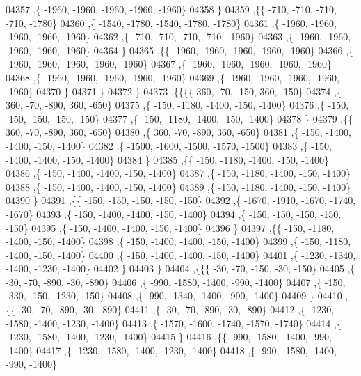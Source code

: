 \begin{DoxyCode}
04357     ,\{ -1960, -1960, -1960, -1960, -1960\}
04358     \}
04359    ,\{\{  -710,  -710,  -710,  -710, -1780\}
04360     ,\{ -1540, -1780, -1540, -1780, -1780\}
04361     ,\{ -1960, -1960, -1960, -1960, -1960\}
04362     ,\{  -710,  -710,  -710,  -710, -1960\}
04363     ,\{ -1960, -1960, -1960, -1960, -1960\}
04364     \}
04365    ,\{\{ -1960, -1960, -1960, -1960, -1960\}
04366     ,\{ -1960, -1960, -1960, -1960, -1960\}
04367     ,\{ -1960, -1960, -1960, -1960, -1960\}
04368     ,\{ -1960, -1960, -1960, -1960, -1960\}
04369     ,\{ -1960, -1960, -1960, -1960, -1960\}
04370     \}
04371    \}
04372   \}
04373  ,\{\{\{\{   360,   -70,  -150,   360,  -150\}
04374     ,\{   360,   -70,  -890,   360,  -650\}
04375     ,\{  -150, -1180, -1400,  -150, -1400\}
04376     ,\{  -150,  -150,  -150,  -150,  -150\}
04377     ,\{  -150, -1180, -1400,  -150, -1400\}
04378     \}
04379    ,\{\{   360,   -70,  -890,   360,  -650\}
04380     ,\{   360,   -70,  -890,   360,  -650\}
04381     ,\{  -150, -1400, -1400,  -150, -1400\}
04382     ,\{ -1500, -1600, -1500, -1570, -1500\}
04383     ,\{  -150, -1400, -1400,  -150, -1400\}
04384     \}
04385    ,\{\{  -150, -1180, -1400,  -150, -1400\}
04386     ,\{  -150, -1400, -1400,  -150, -1400\}
04387     ,\{  -150, -1180, -1400,  -150, -1400\}
04388     ,\{  -150, -1400, -1400,  -150, -1400\}
04389     ,\{  -150, -1180, -1400,  -150, -1400\}
04390     \}
04391    ,\{\{  -150,  -150,  -150,  -150,  -150\}
04392     ,\{ -1670, -1910, -1670, -1740, -1670\}
04393     ,\{  -150, -1400, -1400,  -150, -1400\}
04394     ,\{  -150,  -150,  -150,  -150,  -150\}
04395     ,\{  -150, -1400, -1400,  -150, -1400\}
04396     \}
04397    ,\{\{  -150, -1180, -1400,  -150, -1400\}
04398     ,\{  -150, -1400, -1400,  -150, -1400\}
04399     ,\{  -150, -1180, -1400,  -150, -1400\}
04400     ,\{  -150, -1400, -1400,  -150, -1400\}
04401     ,\{ -1230, -1340, -1400, -1230, -1400\}
04402     \}
04403    \}
04404   ,\{\{\{   -30,   -70,  -150,   -30,  -150\}
04405     ,\{   -30,   -70,  -890,   -30,  -890\}
04406     ,\{  -990, -1580, -1400,  -990, -1400\}
04407     ,\{  -150,  -330,  -150, -1230,  -150\}
04408     ,\{  -990, -1340, -1400,  -990, -1400\}
04409     \}
04410    ,\{\{   -30,   -70,  -890,   -30,  -890\}
04411     ,\{   -30,   -70,  -890,   -30,  -890\}
04412     ,\{ -1230, -1580, -1400, -1230, -1400\}
04413     ,\{ -1570, -1600, -1740, -1570, -1740\}
04414     ,\{ -1230, -1580, -1400, -1230, -1400\}
04415     \}
04416    ,\{\{  -990, -1580, -1400,  -990, -1400\}
04417     ,\{ -1230, -1580, -1400, -1230, -1400\}
04418     ,\{  -990, -1580, -1400,  -990, -1400\}

\end{DoxyCode}
